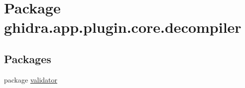 \hypertarget{namespaceghidra_1_1app_1_1plugin_1_1core_1_1decompiler}{}\section{Package ghidra.\+app.\+plugin.\+core.\+decompiler}
\label{namespaceghidra_1_1app_1_1plugin_1_1core_1_1decompiler}
\subsection*{Packages}
\begin{DoxyCompactItemize}
\item 
package \mbox{\hyperlink{namespaceghidra_1_1app_1_1plugin_1_1core_1_1decompiler_1_1validator}{validator}}
\end{DoxyCompactItemize}
